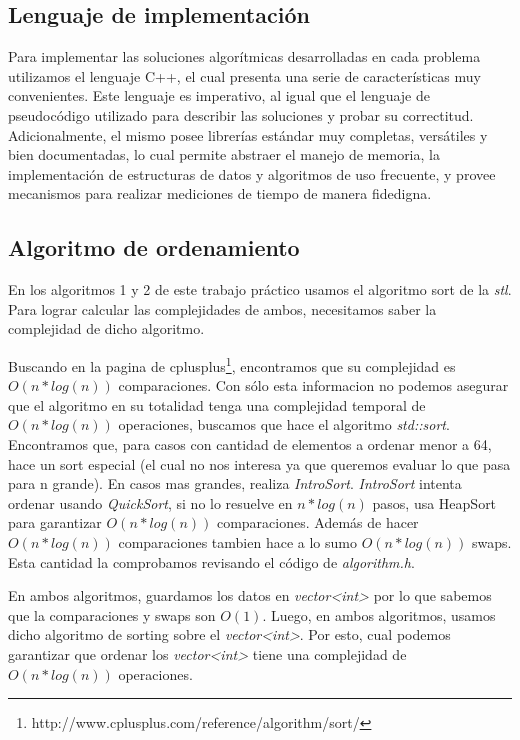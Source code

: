 \subsection{Lenguaje de implementación}

Para implementar las soluciones algorítmicas desarrolladas en cada problema utilizamos el lenguaje C++, el cual presenta una serie de características muy convenientes. Este lenguaje es imperativo, al igual que el lenguaje de pseudocódigo utilizado para describir las soluciones y probar su correctitud. Adicionalmente, el mismo posee librerías estándar muy completas, versátiles y bien documentadas, lo cual permite abstraer el manejo de memoria, la implementación de estructuras de datos y algoritmos de uso frecuente, y provee mecanismos para realizar mediciones de tiempo de manera fidedigna.

\subsection{Algoritmo de ordenamiento}

En los algoritmos 1 y 2 de este trabajo práctico usamos el algoritmo sort de la \emph{stl}. Para lograr calcular las complejidades de ambos, necesitamos saber la complejidad de dicho algoritmo.

Buscando en la pagina de cplusplus\footnote{http://www.cplusplus.com/reference/algorithm/sort/}, encontramos que su complejidad es $O(n*log (n))$  comparaciones. Con sólo esta informacion no podemos asegurar que el algoritmo en su totalidad tenga una complejidad temporal de $O(n*log (n))$  operaciones, buscamos que hace el algoritmo \emph{std::sort}. Encontramos que, para casos con cantidad de elementos a ordenar menor a 64, hace un sort especial (el cual no nos interesa ya que queremos evaluar lo que pasa para n grande). En casos mas grandes, realiza \emph{IntroSort}. \emph{IntroSort} intenta ordenar usando \emph{QuickSort}, si no lo resuelve en $n*log (n)$ pasos, usa HeapSort para garantizar $O(n*log (n))$ comparaciones. Además de hacer $O(n*log (n))$  comparaciones tambien hace a lo sumo $O(n*log (n))$ swaps. Esta cantidad la comprobamos revisando el código de \emph{algorithm.h}.


En ambos algoritmos, guardamos los datos en \emph{vector<int>} por lo que sabemos que la comparaciones y swaps son $O(1)$. Luego, en ambos algoritmos, usamos dicho algoritmo de sorting sobre el  \emph{vector<int>}. Por esto, cual podemos garantizar que ordenar los \emph{vector<int>} tiene una complejidad de $O(n*log (n))$ operaciones.

